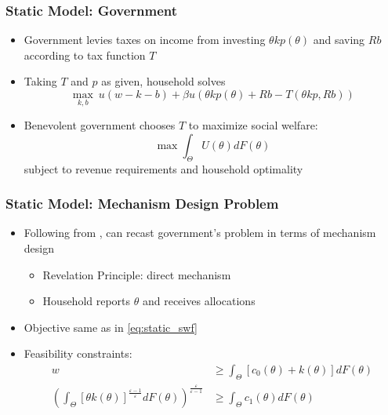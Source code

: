 \documentclass{beamer}
\begin{document}
\begin{frame}
    \frametitle{Static Model: Government}

    \begin{itemize}
        \item Government levies taxes on income from investing \( \theta k p(\theta) \) and saving \( Rb \) according to tax function \( T \)
        \item Taking \( T \) and \( p \) as given, household solves 
        \begin{equation*}
            \max_{k,b}\ u\left(w-k-b\right)+\beta u\left(\theta kp\left(\theta\right)+Rb-T\left(\theta kp,Rb\right)\right)
        \end{equation*} 
        \item Benevolent government chooses \( T \) to maximize social welfare: 
        \begin{equation}
            \max \int_{\Theta}U\left(\theta\right)dF\left(\theta\right) \label{eq:static_swf}
        \end{equation}
        subject to revenue requirements and household optimality 
    \end{itemize}

\end{frame}

\begin{frame}
    \frametitle{Static Model: Mechanism Design Problem}

    \begin{itemize}
        \item Following from \cite{mirrlees1971exploration}, can recast government's problem in terms of mechanism design
        \begin{itemize}
            \item Revelation Principle: direct mechanism
            \item Household reports \( \theta \) and receives allocations
        \end{itemize} 
        \item Objective same as in \eqref{eq:static_swf}
        \item Feasibility constraints: 
        \begin{align*}
            w&\ge\int_{\Theta}\left[c_{0}\left(\theta\right)+k\left(\theta\right)\right]dF\left(\theta\right) \\
    \left(\int_{\Theta}\left[\theta k\left(\theta\right)\right]^{\frac{\varepsilon-1}{\varepsilon}}dF\left(\theta\right)\right)^{\frac{\varepsilon}{\varepsilon-1}}&\ge\int_{\Theta}c_{1}\left(\theta\right)dF\left(\theta\right) 
        \end{align*}
    \end{itemize}

\end{frame}
\end{document}
